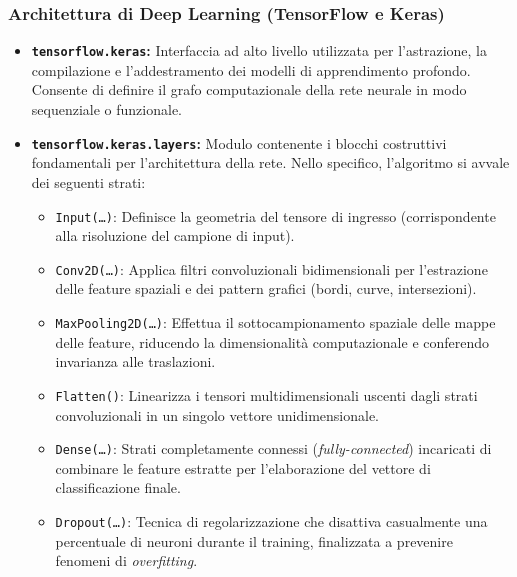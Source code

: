 \documentclass[12pt,a4paper]{article}
\begin{document}
	\subsubsection{Architettura di Deep Learning (TensorFlow e Keras)}
	\begin{itemize}
		\item \textbf{\texttt{tensorflow.keras}:} Interfaccia ad alto livello utilizzata per l'astrazione, la compilazione e l'addestramento dei modelli di apprendimento profondo. Consente di definire il grafo computazionale della rete neurale in modo sequenziale o funzionale.
		\item \textbf{\texttt{tensorflow.keras.layers}:} Modulo contenente i blocchi costruttivi fondamentali per l'architettura della rete. Nello specifico, l'algoritmo si avvale dei seguenti strati:
		\begin{itemize}
			\item \texttt{Input(\dots)}: Definisce la geometria del tensore di ingresso (corrispondente alla risoluzione del campione di input).
			\item \texttt{Conv2D(\dots)}: Applica filtri convoluzionali bidimensionali per l'estrazione delle feature spaziali e dei pattern grafici (bordi, curve, intersezioni).
			\item \texttt{MaxPooling2D(\dots)}: Effettua il sottocampionamento spaziale delle mappe delle feature, riducendo la dimensionalità computazionale e conferendo invarianza alle traslazioni.
			\item \texttt{Flatten()}: Linearizza i tensori multidimensionali uscenti dagli strati convoluzionali in un singolo vettore unidimensionale.
			\item \texttt{Dense(\dots)}: Strati completamente connessi (\textit{fully-connected}) incaricati di combinare le feature estratte per l'elaborazione del vettore di classificazione finale.
			\item \texttt{Dropout(\dots)}: Tecnica di regolarizzazione che disattiva casualmente una percentuale di neuroni durante il training, finalizzata a prevenire fenomeni di \textit{overfitting}.
		\end{itemize}
	\end{itemize}

	\bigskip
\end{document}
